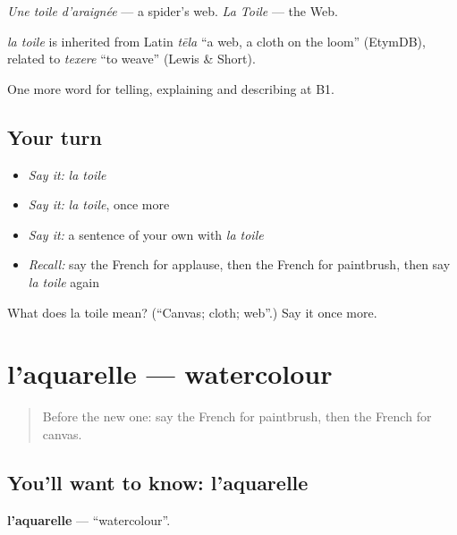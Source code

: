 \emph{Une toile d'araignée} — a spider's web. \emph{La Toile} — the Web.

\begin{cousinweb}
\emph{la toile} is inherited from Latin \emph{tēla} \textquotedblleft{}a web, a cloth on the loom\textquotedblright{} (EtymDB), related to \emph{texere} \textquotedblleft{}to weave\textquotedblright{} (Lewis \& Short).
\end{cousinweb}

\begin{grammarlens}[title={What you've built}]
One more word for telling, explaining and describing at B1.
\end{grammarlens}

\subsection*{Your turn}
\begin{itemize}
\raggedright
  \item \emph{Say it:} \emph{la toile}
  \item \emph{Say it:} \emph{la toile}, once more
  \item \emph{Say it:} a sentence of your own with \emph{la toile}
  \item \emph{Recall:} say the French for applause, then the French for paintbrush, then say \emph{la toile} again
\end{itemize}

\begin{tcolorbox}[breakable,colback=teal!4,colframe=teal!35!black,title={Before you move on}]
What does la toile mean? (\textquotedblleft{}Canvas; cloth; web\textquotedblright{}.) Say it once more.
\end{tcolorbox}
\section[l'aquarelle]{l'aquarelle — watercolour}

\label{lesson:FR-C516-aquarelle}



\begin{quote}
Before the new one: say the French for paintbrush, then the French for canvas.
\end{quote}

\subsection*{You'll want to know: l'aquarelle}
\textbf{l'aquarelle} — \textquotedblleft{}watercolour\textquotedblright{}.

